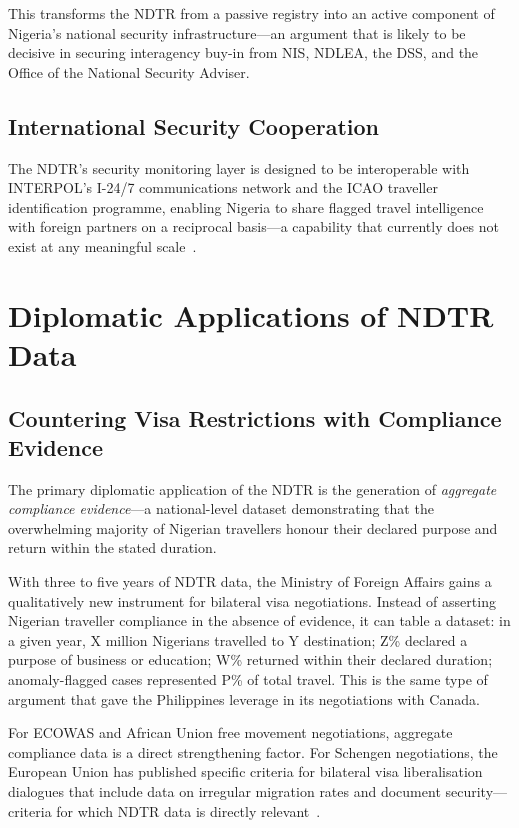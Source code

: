 \documentclass[11pt]{article}
\begin{document}
This transforms the NDTR from a passive registry into an active
component of Nigeria's national security infrastructure---an
argument that is likely to be decisive in securing interagency
buy-in from NIS, NDLEA, the DSS, and the Office of the
National Security Adviser.

\subsection{International Security Cooperation}

The NDTR's security monitoring layer is designed to be interoperable
with INTERPOL's I-24/7 communications network and the ICAO
traveller identification programme, enabling Nigeria to share
flagged travel intelligence with foreign partners on a
reciprocal basis---a capability that currently does not exist
at any meaningful scale~\cite{icao2023}.

\section{Diplomatic Applications of NDTR Data}
\label{sec:diplomatic}

\subsection{Countering Visa Restrictions with Compliance Evidence}

The primary diplomatic application of the NDTR is the generation
of \textit{aggregate compliance evidence}---a national-level
dataset demonstrating that the overwhelming majority of Nigerian
travellers honour their declared purpose and return within the
stated duration.

With three to five years of NDTR data, the Ministry of Foreign Affairs
gains a qualitatively new instrument for bilateral visa negotiations.
Instead of asserting Nigerian traveller compliance in the absence of
evidence, it can table a dataset: in a given year, X million Nigerians
travelled to Y destination; Z\% declared a purpose of business or
education; W\% returned within their declared duration;
anomaly-flagged cases represented P\% of total travel.
This is the same type of argument that gave the Philippines leverage
in its negotiations with Canada.

For ECOWAS and African Union free movement negotiations, aggregate
compliance data is a direct strengthening factor.
For Schengen negotiations, the European Union has published specific
criteria for bilateral visa liberalisation dialogues that include
data on irregular migration rates and document security---criteria
for which NDTR data is directly relevant~\cite{euvisadialogue2023}.
\end{document}
